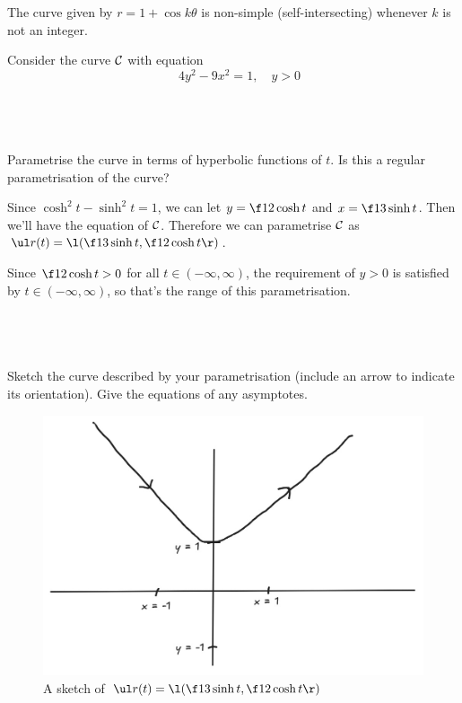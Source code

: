 \documentclass[a4paper]{article}
\begin{document}
The curve given by $r = 1 + \cos k\theta$ is non-simple (self-intersecting) whenever $k$ is not an integer.


\begin{questionbody}
Consider the curve $\cal C$ with equation \[
\quad 4y^2 - 9x^2 = 1, \quad y > 0
\]
\end{questionbody}

\subsection{~} %

\begin{questionbody}
Parametrise the curve in terms of hyperbolic functions of $t$. Is this a regular parametrisation of the curve?
\end{questionbody}

Since $\cosh^2 t - \sinh^2 t = 1$, we can let $y = \f12 \cosh t$ and $x = \f13 \sinh t$. Then we'll have the equation of $\cal C$. Therefore we can parametrise $\cal C$ as $\ul r(t) = \l( \f13 \sinh t, \f12 \cosh t \r)$.

Since $\f12 \cosh t > 0$ for all $t \in (-\infty, \infty)$, the requirement of $y>0$ is satisfied by $t \in (-\infty, \infty)$, so that's the range of this parametrisation.

\subsection{~} %

\begin{questionbody}
Sketch the curve described by your parametrisation (include an arrow to indicate its orientation). Give the equations of any asymptotes.
\end{questionbody}

\begin{figure}[h]
	\centering
	\includegraphics[scale=0.3]{Q2b}
	\caption{A sketch of $\ul r(t) = \l( \f13 \sinh t, \f12 \cosh t \r)$}
\end{figure}
\end{document}
